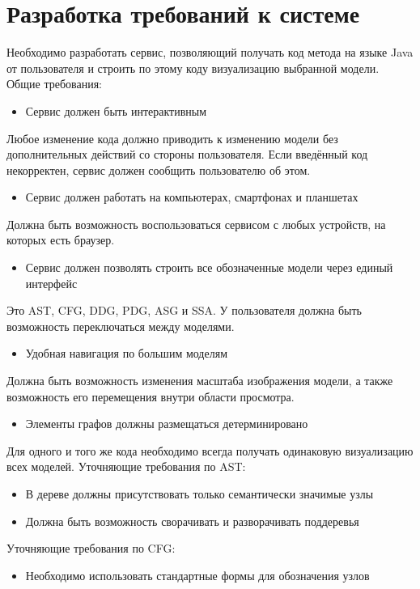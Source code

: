 \section{Разработка требований к системе} \label{ch3:sec2}
Необходимо разработать сервис, позволяющий получать код метода на языке Java от пользователя и строить по этому коду визуализацию выбранной модели.
Общие требования: 
\begin{itemize}
\item Сервис должен быть интерактивным
\end{itemize}
Любое изменение кода должно приводить к изменению модели без дополнительных действий со стороны пользователя. Если введённый код некорректен, сервис должен сообщить пользователю об этом.
\begin{itemize}
\item Сервис должен работать на компьютерах, смартфонах и планшетах
\end{itemize}
Должна быть возможность воспользоваться сервисом с любых устройств, на которых есть браузер.
\begin{itemize}
\item Сервис должен позволять строить все обозначенные модели через единый интерфейс
\end{itemize}
Это AST, CFG, DDG, PDG, ASG и SSA. У пользователя должна быть возможность переключаться между моделями.
\begin{itemize}
\item Удобная навигация по большим моделям
\end{itemize}
Должна быть возможность изменения масштаба изображения модели, а также возможность его перемещения внутри области просмотра.
\begin{itemize}
\item Элементы графов должны размещаться детерминировано
\end{itemize}
Для одного и того же кода необходимо всегда получать одинаковую визуализацию всех моделей.
Уточняющие требования по AST:
\begin{itemize}
\item В дереве должны присутствовать только семантически значимые узлы
\item Должна быть возможность сворачивать и разворачивать поддеревья
\end{itemize}
Уточняющие требования по CFG:
\begin{itemize}
\item Необходимо использовать стандартные формы для обозначения узлов
\end{itemize}
